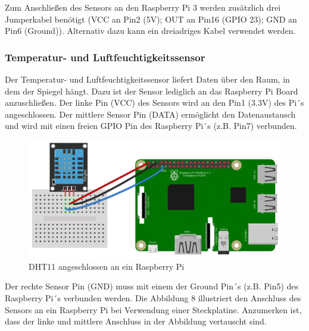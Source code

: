 Zum Anschließen des Sensors an den Raspberry Pi 3 werden zusätzlich drei Jumperkabel benötigt (VCC an Pin2 (5V); OUT an Pin16 (GPIO 23); GND an Pin6 (Ground)). Alternativ dazu kann ein dreiadriges Kabel verwendet werden.

\subsubsection*{Temperatur- und Luftfeuchtigkeitssensor}
Der Temperatur- und Luftfeuchtigkeitssensor liefert Daten über den Raum, in dem der Spiegel hängt. Dazu ist der Sensor lediglich an das Raspberry Pi Board anzuschließen.
 Der linke Pin (VCC) des Sensors wird an den Pin1 (3.3V) des Pi´s angeschlossen. Der mittlere Sensor Pin (DATA)  ermöglicht den Datenaustausch und wird mit einen freien GPIO Pin des Raspberry Pi´s (z.B. Pin7) verbunden. 
\begin{figure}[H]
	\includegraphics[trim=0mm 0mm 0mm 0mm, scale=1]{bilder/DHT11-on-the-Raspberry-Pi.png}
	\caption{DHT11 angeschlossen an ein Raspberry Pi}
\end{figure}
Der rechte Sensor Pin (GND) muss mit einem der Ground Pin´s (z.B. Pin5) des Raspberry Pi´s verbunden werden. Die Abbildung 8 illustriert den Anschluss des Sensors an ein Raspberry Pi bei Verwendung einer Steckplatine. Anzumerken ist, dass der linke und mittlere Anschluss in der Abbildung vertauscht sind.

